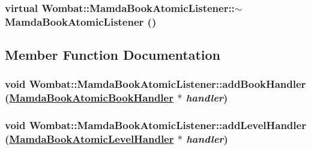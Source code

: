 \hypertarget{classWombat_1_1MamdaBookAtomicListener_e5fac16c2989c755913451373c5d4fbf}{
\subsubsection[$\sim$MamdaBookAtomicListener]{\setlength{\rightskip}{0pt plus 5cm}virtual Wombat::Mamda\-Book\-Atomic\-Listener::$\sim$Mamda\-Book\-Atomic\-Listener ()}}
\label{classWombat_1_1MamdaBookAtomicListener_e5fac16c2989c755913451373c5d4fbf}




\subsection{Member Function Documentation}
\hypertarget{classWombat_1_1MamdaBookAtomicListener_d1d58170780173a80d63128d3a12425c}{
\subsubsection[addBookHandler]{\setlength{\rightskip}{0pt plus 5cm}void Wombat::Mamda\-Book\-Atomic\-Listener::add\-Book\-Handler (\hyperlink{classWombat_1_1MamdaBookAtomicBookHandler}{Mamda\-Book\-Atomic\-Book\-Handler} $\ast$ {\em handler})}}
\label{classWombat_1_1MamdaBookAtomicListener_d1d58170780173a80d63128d3a12425c}


\hypertarget{classWombat_1_1MamdaBookAtomicListener_8ee92b1c11caaf8fb358904dad96b7b7}{
\subsubsection[addLevelHandler]{\setlength{\rightskip}{0pt plus 5cm}void Wombat::Mamda\-Book\-Atomic\-Listener::add\-Level\-Handler (\hyperlink{classWombat_1_1MamdaBookAtomicLevelHandler}{Mamda\-Book\-Atomic\-Level\-Handler} $\ast$ {\em handler})}}
\label{classWombat_1_1MamdaBookAtomicListener_8ee92b1c11caaf8fb358904dad96b7b7}


